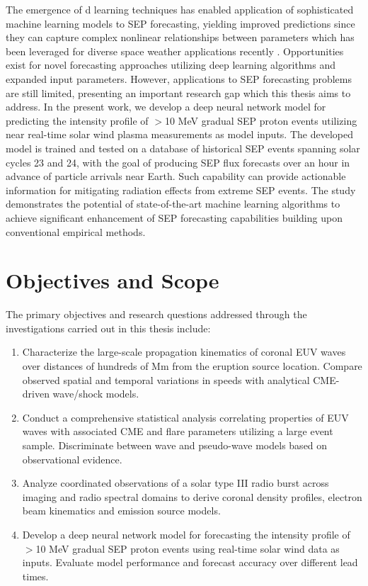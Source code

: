 The emergence of d learning techniques has enabled application of sophisticated machine learning models to SEP forecasting, yielding improved predictions since they can capture complex nonlinear relationships between parameters which has been leveraged for diverse space weather applications recently \citep{florios_2018, camporeale_2019}. Opportunities exist for novel forecasting approaches utilizing deep learning algorithms and expanded input parameters. However, applications to SEP forecasting problems are still limited, presenting an important research gap which this thesis aims to address. 
In the present work, we develop a deep neural network model for predicting the intensity profile of $>$10 MeV gradual SEP proton events utilizing near real-time solar wind plasma measurements as model inputs. The developed model is trained and tested on a database of historical SEP events spanning solar cycles 23 and 24, with the goal of producing SEP flux forecasts over an hour in advance of particle arrivals near Earth. Such capability can provide actionable information for mitigating radiation effects from extreme SEP events. The study demonstrates the potential of state-of-the-art machine learning algorithms to achieve significant enhancement of SEP forecasting capabilities building upon conventional empirical methods.

\section{Objectives and Scope}
The primary objectives and research questions addressed through the investigations carried out in this thesis include:

\begin{enumerate}
    \item Characterize the large-scale propagation kinematics of coronal EUV waves over distances of hundreds of Mm from the eruption source location. Compare observed spatial and temporal variations in speeds with analytical CME-driven wave/shock models.
    \item Conduct a comprehensive statistical analysis correlating properties of EUV waves with associated CME and flare parameters utilizing a large event sample. Discriminate between wave and pseudo-wave models based on observational evidence.
    \item Analyze coordinated observations of a solar type III radio burst across imaging and radio spectral domains to derive coronal density profiles, electron beam kinematics and emission source models.
    \item Develop a deep neural network model for forecasting the intensity profile of $>$10 MeV gradual SEP proton events using real-time solar wind data as inputs. Evaluate model performance and forecast accuracy over different lead times.
\end{enumerate}

